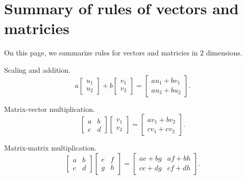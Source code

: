 \documentclass[../main.tex]{subfiles}
\begin{document}
 \section{Summary of rules of vectors and matricies}

On this page, we summarize rules for vectors and matricies in \(2\) dimensions.

Scaling and addition.
\[
  a 
  \begin{bmatrix}
    u_{1} \\ u_{2}
  \end{bmatrix}
  + 
  b 
  \begin{bmatrix}
    v_{1} \\ v_{2}
  \end{bmatrix}
  =
  \begin{bmatrix}
    au_{1} + bv_{1} \\
    au_{2} + bu_{2}
  \end{bmatrix}.
\]

Matrix-vector multiplication.
\[
  \begin{bmatrix}
    a & b \\
    c & d
  \end{bmatrix}
  \begin{bmatrix}
    v_{1} \\ v_{2}
  \end{bmatrix}
  =
  \begin{bmatrix}
    a v_{1} + b v_{2} \\
    c v_{1} + c v_{2}
  \end{bmatrix}.
\]

Matrix-matrix multiplication.
\[
  \begin{bmatrix}
    a & b \\
    c & d
  \end{bmatrix}
  \begin{bmatrix}
    e & f \\
    g & h
  \end{bmatrix}
  =
  \begin{bmatrix}
    ae + bg & af + bh \\
    ce + dg & cf + dh
  \end{bmatrix}.
\]
\end{document}
